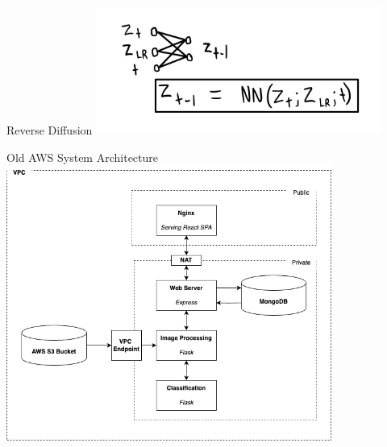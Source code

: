 \begin{frame}{Reverse Diffusion}
    \centering
    \includegraphics[height=0.7\textheight,width=0.7\textwidth,keepaspectratio]{images/mm_reverse.jpeg}
\end{frame}

\begin{frame}{Old AWS System Architecture}
    \centering
    \includegraphics[height=0.8\textheight,width=0.8\textwidth,keepaspectratio]{images/mm_system.png}
\end{frame}

